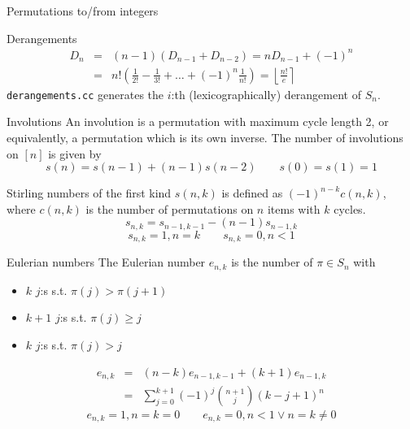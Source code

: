 \clearpage
{}
\categorycontents{}


\begin{algorithm}{Permutations to/from integers}
\end{algorithm}


\begin{algorithm}{Derangements}
\desc
\begin{eqnarray*}
D_n & = & (n-1)(D_{n-1}+D_{n-2}) = nD_{n-1} + (-1)^n \\
    & = & n!\left(\frac 1{2!}-\frac 1{3!}+\ldots+(-1)^n\frac 1{n!}\right) =
\left\lfloor\frac{n!}{e}\right\rceil
\end{eqnarray*}
{\tt derangements.cc} generates the $i$:th (lexicographically)
derangement of $S_n$.
\end{algorithm}

\begin{algorithm}{Involutions}
\desc
An involution is a permutation with maximum cycle length 2, or
equivalently, a permutation which is its own inverse.  The number of
involutions on $[n]$ is given by
$$s(n) = s(n-1) + (n-1)s(n-2) \qquad s(0) = s(1) = 1$$
\end{algorithm}


\begin{algorithm}{Stirling numbers of the first kind}
\desc
$s(n,k)$ is defined as
$(-1)^{n-k}c(n,k)$, where $c(n,k)$ is the number of permutations on
$n$ items with $k$ cycles.
$$s_{n,k} = s_{n-1,k-1} - (n-1)s_{n-1,k}$$
$$s_{n,k} = 1, n = k \qquad s_{n,k} = 0, n < 1$$
\end{algorithm}


\begin{algorithm}{Eulerian numbers}
\desc
The Eulerian number $e_{n,k}$ is the number of $\pi \in S_n$ with
\begin{itemize}
\item $k$ $j$:s s.t. $\pi(j) > \pi(j+1)$
\item $k+1$ $j$:s s.t. $\pi(j) \ge j$
\item $k$ $j$:s s.t. $\pi(j) > j$
\end{itemize}
\begin{eqnarray*}
e_{n,k} & = & (n-k)e_{n-1,k-1} + (k+1) e_{n-1, k}\\
        & = & \sum_{j=0}^{k+1}(-1)^j \binom{n+1}{j} (k - j + 1)^n
\end{eqnarray*}
$$e_{n,k} = 1, n = k = 0 \qquad e_{n,k} = 0, n < 1 \vee n = k \ne 0$$
\end{algorithm}

